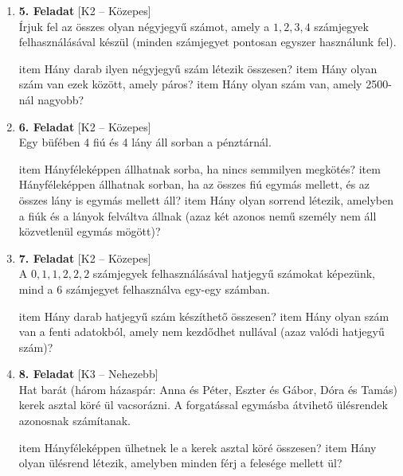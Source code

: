 \documentclass[12pt,a4paper]{article}
\begin{document}
\begin{enumerate}[label=\arabic*., leftmargin=*]
    \vspace{0.4cm}

    \item \textbf{5. Feladat} \textsf{\small [K2 – Közepes]} \\
    Írjuk fel az összes olyan négyjegyű számot, amely a $1, 2, 3, 4$ számjegyek felhasználásával készül (minden számjegyet pontosan egyszer használunk fel). 
    \begin{enumerate}[label=\alph*)]
        item Hány darab ilyen négyjegyű szám létezik összesen?
        item Hány olyan szám van ezek között, amely páros?
        item Hány olyan szám van, amely 2500-nál nagyobb?
    \end{enumerate}

    \vspace{0.4cm}

    \item \textbf{6. Feladat} \textsf{\small [K2 – Közepes]} \\
    Egy büfében 4 fiú és 4 lány áll sorban a pénztárnál.
    \begin{enumerate}[label=\alph*)]
        item Hányféleképpen állhatnak sorba, ha nincs semmilyen megkötés?
        item Hányféleképpen állhatnak sorban, ha az összes fiú egymás mellett, és az összes lány is egymás mellett áll?
        item Hány olyan sorrend létezik, amelyben a fiúk és a lányok felváltva állnak (azaz két azonos nemű személy nem áll közvetlenül egymás mögött)?
    \end{enumerate}

    \vspace{0.4cm}

    \item \textbf{7. Feladat} \textsf{\small [K2 – Közepes]} \\
    A $0, 1, 1, 2, 2, 2$ számjegyek felhasználásával hatjegyű számokat képezünk, mind a 6 számjegyet felhasználva egy-egy számban.
    \begin{enumerate}[label=\alph*)]
        item Hány darab hatjegyű szám készíthető összesen?
        item Hány olyan szám van a fenti adatokból, amely nem kezdődhet nullával (azaz valódi hatjegyű szám)?
    \end{enumerate}

    \vspace{0.4cm}

    \item \textbf{8. Feladat} \textsf{\small [K3 – Nehezebb]} \\
    Hat barát (három házaspár: Anna és Péter, Eszter és Gábor, Dóra és Tamás) kerek asztal köré ül vacsorázni. A forgatással egymásba átvihető ülésrendek azonosnak számítanak.
    \begin{enumerate}[label=\alph*)]
        item Hányféleképpen ülhetnek le a kerek asztal köré összesen?
        item Hány olyan ülésrend létezik, amelyben minden férj a felesége mellett ül?
    \end{enumerate}


\end{enumerate}
\end{document}
